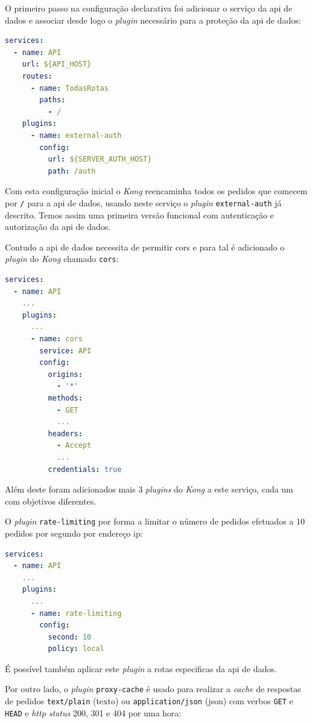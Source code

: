 O primeiro passo na configuração declarativa foi adicionar o serviço da \acrshort{api} de dados e associar desde logo o \textit{plugin} necessário para a proteção da \acrshort{api} de dados:
\begin{lstlisting}[language=yaml, caption=Configuração declarativa do \textit{Kong}: \acrshort{api} de dados]
services:
  - name: API
    url: ${API_HOST}
    routes:
      - name: TodasRotas
        paths:
          - /
    plugins:
      - name: external-auth
        config:
          url: ${SERVER_AUTH_HOST}
          path: /auth
\end{lstlisting}

Com esta configuração inicial o \textit{Kong} reencaminha todos os pedidos que comecem por \texttt{/} para a \acrshort{api} de dados, usando neste serviço o \textit{plugin} \texttt{external-auth} já descrito. Temos assim uma primeira versão funcional com autenticação e autorização da \acrshort{api} de dados.

Contudo a \acrshort{api} de dados necessita de permitir \acrshort{cors} e para tal é adicionado o \textit{plugin} do \textit{Kong} chamado \texttt{cors}\cite{kongCORS}:
\begin{lstlisting}[language=yaml, caption=Configuração declarativa do \textit{Kong}: \textit{plugin} \texttt{cors}]
services:
  - name: API
    ...
    plugins:
      ...
      - name: cors
        service: API
        config:
          origins:
            - '*'
          methods:
            - GET
            ...
          headers:
            - Accept
            ...
          credentials: true
\end{lstlisting}

Além deste foram adicionados mais 3 \textit{plugins} do \textit{Kong} a este serviço, cada um com objetivos diferentes. 

O \textit{plugin} \texttt{rate-limiting} por forma a limitar o número de pedidos efetuados a 10 pedidos por segundo por endereço \acrshort{ip}\cite{kongRateLimiting}:
\begin{lstlisting}[language=yaml, caption=Configuração declarativa do \textit{Kong}: \textit{plugin} \texttt{rate-limiting}]
services:
  - name: API
    ...
    plugins:
      ...
      - name: rate-limiting
        config:
          second: 10
          policy: local
\end{lstlisting}

É possível também aplicar este \textit{plugin} a rotas especificas da \acrshort{api} de dados.

Por outro lado, o \textit{plugin} \texttt{proxy-cache} é usado para realizar a \textit{cache} de respostas de pedidos \texttt{text/plain} (texto) ou \texttt{application/json} (\acrshort{json}) com verbos \texttt{GET} e \texttt{HEAD} e \textit{\acrshort{http} status} 200, 301 e 404 por uma hora\cite{kongProxyCache}:

